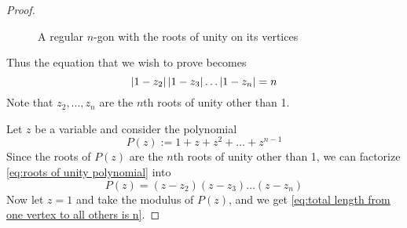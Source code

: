 \documentclass[notoc,notitlepage]{tufte-book}
\begin{document}
\begin{ex}
\begin{proof}
		\begin{figure}
			\begin{center}
			\end{center}
			\caption[loftitle]{A regular $n$-gon with the roots of unity on its vertices}
			\label{figure:regular n-gon with roots of unity}
		\end{figure}

		Thus the equation that we wish to prove becomes
		\begin{equation}\label{eq:total length from one vertex to all others is n}
			\left|1 - z_2\right|\left|1 - z_3\right|\hdots\left|1 - z_n\right| = n
		\end{equation}
		Note that $z_2, ..., z_n$ are the $n$th roots of unity other than 1.

		Let $z$ be a variable and consider the polynomial
		\begin{equation}\label{eq:roots of unity polynomial}
			P(z) := 1 + z + z^2 + \hdots + z^{n - 1}
		\end{equation}
		Since the roots of $P(z)$ are the $n$th roots of unity other than 1, we can factorize \cref{eq:roots of unity polynomial} into
		\begin{equation*}
			P(z) = (z - z_2)(z - z_3) \hdots (z - z_n)
		\end{equation*}
		Now let $z = 1$ and take the modulus of $P(z)$, and we get \cref{eq:total length from one vertex to all others is n}.
	\end{proof}
\end{ex}
\end{document}
